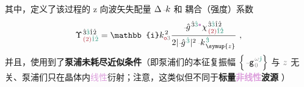 其中，定义了该过程的 z 向\textcolor{PineGreen}{波矢失配量} $\Delta \Xint{\begin{smallmatrix} ~ \\ {}^{}_{\mathcolor{gray}{-}} \\ ~ \end{smallmatrix}}{15}{k}$   和 \textcolor{NavyBlue}{耦合（强度）系数}
\begin{align} \label{eq:coupling-coeff}
	\Upsilon^{\;\! \hat{3} \textcolor{PineGreen}{\hat{3}} \hat{1} \hat{2} }_{\;\! \textcolor{Maroon}{(2)} \textcolor{PineGreen}{\hat{1} \hat{2}}} = \mathbb{i} k_{\textcolor{Maroon}{\mathsf{o}} \mathcolor{gray}{3}}^{\;\! 2} \frac{\Xint{{}^{}_{\mathcolor{gray}{-}}}{10}{\hat{g}}^{\;\! \hat{3} \textcolor{PineGreen}{\hat{3}} \textcolor{Plum}{*}}_{\;\! } {\chi}^{\;\! \hat{3} \textcolor{PineGreen}{\hat{3}} \hat{1} \hat{2} }_{\;\! \textcolor{Maroon}{(2)} \textcolor{PineGreen}{\hat{1} \hat{2}}} }{ 2 \lvert \Xint{{}^{}_{\mathcolor{gray}{-}}}{10}{\hat{g}}^{\;\! \textcolor{PineGreen}{\hat{3}}} \rvert^2 \Xint{\begin{smallmatrix} ~ \\ {}^{}_{\mathcolor{gray}{-}} \\ ~ \end{smallmatrix}}{15}{k}_{\;\! \symup{z}}^{\;\!  \textcolor{PineGreen}{\hat{3}}} } ~,
\end{align}
并且，使用到了\textbf{\textcolor{NavyBlue}{泵浦未耗尽}近似条件}（即\textcolor{NavyBlue}{泵浦们}的\textcolor{PineGreen}{本征复振幅} $\left\{ \Xint{\begin{smallmatrix} ~ \\ {}^{}_{\mathcolor{gray}{-}} \\ ~ \end{smallmatrix}}{09}{\mathtt{g}}^{\;\! \mathcolor{gray}{\omega} \textcolor{PineGreen}{\hat{\jmath}}}_{\;\! \mathcolor{gray}{0}} \right\}$ 与 $\mathcolor{gray}{z}$ 无关、\textcolor{NavyBlue}{泵浦们}只在晶体内\textcolor{Plum}{线性}衍射；注意，这类似但不同于\textbf{标量\textcolor{Plum}{非线性}\textcolor{NavyBlue}{波源}} ）
